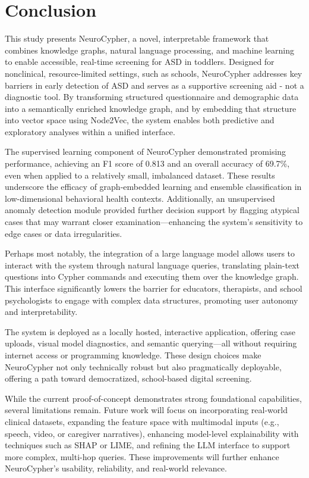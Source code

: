 \documentclass[pdflatex,sn-basic]{sn-jnl}%
\theoremstyle{thmstyleone}%
\theoremstyle{thmstyletwo}%
\theoremstyle{thmstylethree}%
\begin{document}
  \section{Conclusion}\label{sec13}
  This study presents NeuroCypher, a novel, interpretable framework that combines knowledge graphs, natural language processing,
  and machine learning to enable accessible, real-time screening for ASD in toddlers. Designed for nonclinical, resource-limited
  settings, such as schools, NeuroCypher addresses key barriers in early detection of ASD and serves as a supportive screening
  aid - not a diagnostic tool. By transforming structured questionnaire and demographic data into a semantically enriched
  knowledge graph, and by embedding that structure into vector space using Node2Vec, the system enables both predictive and
  exploratory analyses within a unified interface.

  The supervised learning component of NeuroCypher demonstrated promising performance, achieving an F1 score of 0.813 and an
  overall accuracy of 69.7\%, even when applied to a relatively small, imbalanced dataset. These results underscore the efficacy
  of graph-embedded learning and ensemble classification in low-dimensional behavioral health contexts. Additionally, an
  unsupervised anomaly detection module provided further decision support by flagging atypical cases that may warrant closer
  examination—enhancing the system’s sensitivity to edge cases or data irregularities.

  Perhaps most notably, the integration of a large language model allows users to interact with the system through natural
  language queries, translating plain-text questions into Cypher commands and executing them over the knowledge graph. This
  interface significantly lowers the barrier for educators, therapists, and school psychologists to engage with complex data
  structures, promoting user autonomy and interpretability.

  The system is deployed as a locally hosted, interactive application, offering case uploads, visual model diagnostics, and
  semantic querying—all without requiring internet access or programming knowledge. These design choices make NeuroCypher not
  only technically robust but also pragmatically deployable, offering a path toward democratized, school-based digital screening.

  While the current proof-of-concept demonstrates strong foundational capabilities, several limitations remain. Future work will
  focus on incorporating real-world clinical datasets, expanding the feature space with multimodal inputs (e.g., speech, video,
  or caregiver narratives), enhancing model-level explainability with techniques such as SHAP or LIME, and refining the LLM
  interface to support more complex, multi-hop queries. These improvements will further enhance NeuroCypher’s usability,
  reliability, and real-world relevance.
\end{document}
